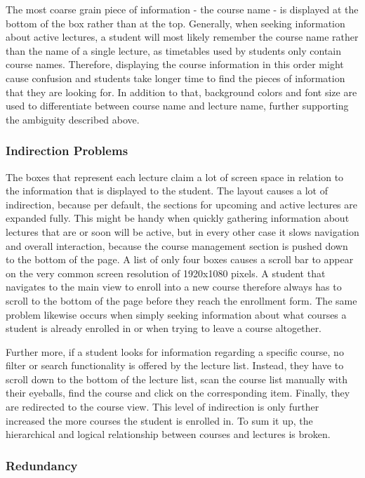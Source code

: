The most coarse grain piece of information - the course name - is displayed at the bottom of the box rather than at the top. Generally, when seeking information about active lectures, a student will most likely remember the course name rather than the name of a single lecture, as timetables used by students only contain course names. Therefore, displaying the course information in this order might cause confusion and students take longer time to find the pieces of information that they are looking for.
In addition to that, background colors and font size are used to differentiate between course name and lecture name, further supporting the ambiguity described above.

\subsubsection{Indirection Problems}

The boxes that represent each lecture claim a lot of screen space in relation to the information that is displayed to the student. The layout causes a lot of indirection, because per default, the sections for upcoming and active lectures are expanded fully. This might be handy when quickly gathering information about lectures that are or soon will be active, but in every other case it slows navigation and overall interaction, because the course management section is pushed down to the bottom of the page.
A list of only four boxes causes a scroll bar to appear on the very common screen resolution of 1920x1080 pixels. A student that navigates to the main view to enroll into a new course therefore always has to scroll to the bottom of the page before they reach the enrollment form. The same problem likewise occurs when simply seeking information about what courses a student is already enrolled in or when trying to leave a course altogether. 

Further more, if a student looks for information regarding a specific course, no filter or search functionality is offered by the lecture list. Instead, they have to scroll down to the bottom of the lecture list, scan the course list manually with their eyeballs, find the course and click on the corresponding item. Finally, they are redirected to the course view. This level of indirection is only further increased the more courses the student is enrolled in. 
To sum it up, the hierarchical and logical relationship between courses and lectures is broken. 

\subsubsection{Redundancy}

